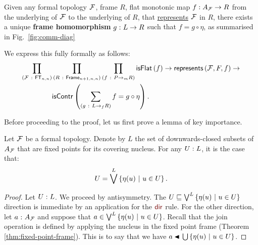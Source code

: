 \begin{thm}\label{thm:univ-prop}
  Given any formal topology $\mathcal{F}{}$, frame $R$, flat monotonic map $f : A_{\mathcal{F}{}} \rightarrow R$
  from the underlying \verposet{} of $\mathcal{F}{}$ to the underlying \verposet{} of $R$, that
  \hyperref[defn:rep]{represents} $\mathcal{F}{}$ in $R$, there exists a unique \textbf{frame
    homomorphism} $g\hspace{0.1mm}:\hspace{0.1mm}L \rightarrow R$ such that $f = g \circ \eta$, as summarised in
  Fig.~\ref{fig:comm-diag}

  We express this fully formally as follows:
  \begin{align*}
    \pity{\McF{}}{\mathsf{FT}_{n, n}}{
      &\pity{R}{\mathsf{Frame}_{n+1, n, n}}{
         \pity{f}{P \rightarrow_m R}{
           \isflat{f} \rightarrow \mathsf{represents}\left( \McF{} , F , f \right) \rightarrow\\
             &\iscontr{\sigmaty{g}{L \rightarrow_f R}{f = g \circ \eta}}
        }
      }
    }.
  \end{align*}
\end{thm}

Before proceeding to the proof, let us first prove a lemma of key importance.

\begin{lemma}\label{lem:main}
  Let $\mathcal{F}{}$ be a formal topology. Denote by $L$ the set of downwards-closed subsets of
  $A_{\mathcal{F}{}}$ that are fixed points for its covering nucleus. For any $U\hspace{0.1mm}:\hspace{0.1mm}L$,
  it is the case that:
  \begin{equation*}
    U = \bigvee^L \left\{  \eta(u) ~|~ u \in U  \right\}.
  \end{equation*}
\end{lemma}
\begin{proof}
  Let $U\hspace{0.1mm}:\hspace{0.1mm}L$. We proceed by antisymmetry. The $U \sqsubseteq \bigvee^L \left\{  \eta(u) ~|~ u \in U  \right\}$
  direction is immediate by an application for the $\ruledir{}$ rule. For the other
  direction, let $a\hspace{0.1mm}:\hspace{0.1mm}A_{\mathcal{F}{}}$ and suppose that
  $a \in \bigvee^L \left\{  \eta(u) ~|~ u \in U  \right\}$. Recall that the join operation is defined by
  applying the nucleus in the fixed point frame (Theorem \ref{thm:fixed-point-frame}).
  This is to say that we have $\covers{a}{\bigcup \setof{ \eta(u) ~|~ u \in U }}$.
\end{proof}

